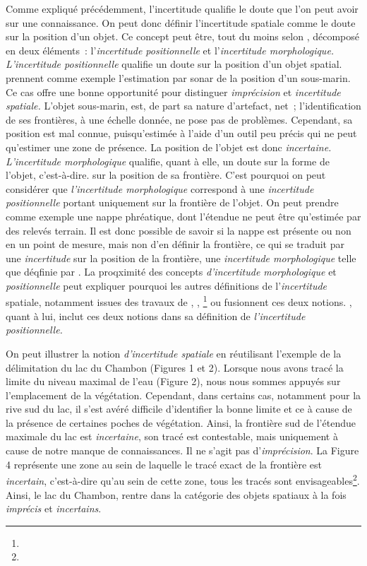 Comme expliqué précédemment, l’incertitude qualifie le doute que l’on
peut avoir sur une connaissance. On peut donc définir l’incertitude
spatiale comme le doute sur la position d’un objet. Ce concept peut
être, tout du moins selon \textcite{Tossebro2002}, décomposé en deux
éléments : l’\emph{incertitude positionnelle} et l’\emph{incertitude
  morphologique.} \emph{L’incertitude positionnelle} qualifie un doute
sur la position d’un objet spatial. \textcite{Tossebro2008} prennent
comme exemple l’estimation par sonar de la position d’un
sous-marin. Ce cas offre une bonne opportunité pour distinguer
\emph{imprécision} et \emph{incertitude spatiale.} L’objet sous-marin,
est, de part sa nature d’artefact, net ; l’identification de ses
frontières, à une échelle donnée, ne pose pas de problèmes. Cependant,
sa position est mal connue, puisqu’estimée à l’aide d’un outil peu
précis qui ne peut qu’estimer une zone de présence. La position de
l’objet est donc \emph{incertaine.} \emph{L’incertitude morphologique}
qualifie, quant à elle, un doute sur la forme de l’objet,
c’est-à-dire. sur la position de sa frontière. C’est pourquoi on peut
considérer que \emph{l’incertitude morphologique} correspond à une
\emph{incertitude positionnelle} portant uniquement sur la frontière
de l’objet. On peut prendre comme exemple une nappe phréatique, dont
l’étendue ne peut être qu’estimée par des relevés terrain. Il est donc
possible de savoir si la nappe est présente ou non en un point de
mesure, mais non d’en définir la frontière, ce qui se traduit par une
\emph{incertitude} sur la position de la frontière, \ie une
\emph{incertitude morphologique} telle que déqfinie par
\textcite{Tossebro2002,Tossebro2008}. La proqximité des concepts
\emph{d’incertitude morphologique} et \emph{positionnelle} peut
expliquer pourquoi les autres définitions de l’\emph{incertitude}
spatiale, notamment issues des travaux de \textcite{Clementini2008},
\textcite{Lagacherie1996}, \textcite{Freksa1996}\footnote{} ou
\textcite{Schneider1999} fusionnent ces deux
notions. \textcite{Dutton1992}, quant à lui, inclut ces deux notions
dans sa définition de \emph{l’incertitude positionnelle.}

On peut illustrer la notion \emph{d’incertitude spatiale} en
réutilisant l’exemple de la délimitation du lac du Chambon (Figures 1
et 2). Lorsque nous avons tracé la limite du niveau maximal de l’eau
(Figure 2), nous nous sommes appuyés sur l’emplacement de la
végétation. Cependant, dans certains cas, notamment pour la rive sud
du lac, il s’est avéré difficile d’identifier la bonne limite et ce à
cause de la présence de certaines poches de végétation. Ainsi, la
frontière sud de l’étendue maximale du lac est \emph{incertaine}, son
tracé est contestable, mais uniquement à cause de notre manque de
connaissances. Il ne s’agit pas d’\emph{imprécision}. La Figure 4
représente une zone au sein de laquelle le tracé exact de la frontière
est \emph{incertain}, c’est-à-dire qu’au sein de cette zone, tous les
tracés sont envisageables\footnote{}. Ainsi, le lac du Chambon, rentre
dans la catégorie des objets spatiaux à la fois \emph{imprécis} et
\emph{incertains}.

